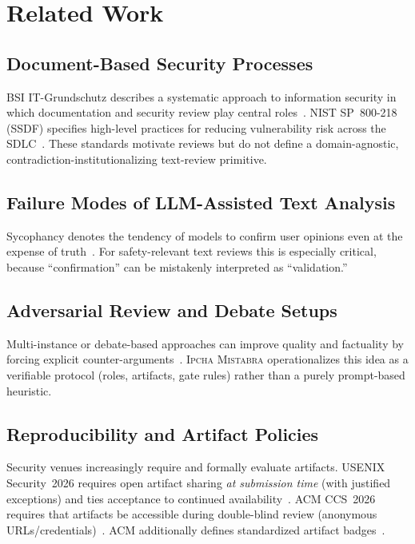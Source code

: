 \documentclass[11pt,a4paper]{article}
\newcommand{\methodname}{\textsc{Ipcha Mistabra}}
\begin{document}
\section{Related Work}

\subsection{Document-Based Security Processes}
BSI IT-Grundschutz describes a systematic approach to information security in which documentation and security review play central roles~\cite{bsi_standard_100_2}.
NIST SP~800-218 (SSDF) specifies high-level practices for reducing vulnerability risk across the SDLC~\cite{nist_sp800_218}.
These standards motivate reviews but do not define a domain-agnostic, contradiction-institutionalizing text-review primitive.

\subsection{Failure Modes of LLM-Assisted Text Analysis}
Sycophancy denotes the tendency of models to confirm user opinions even at the expense of truth~\cite{sharma_sycophancy}.
For safety-relevant text reviews this is especially critical, because ``confirmation'' can be mistakenly interpreted as ``validation.''

\subsection{Adversarial Review and Debate Setups}
Multi-instance or debate-based approaches can improve quality and factuality by forcing explicit counter-arguments~\cite{du_multiagent_debate}.
\methodname{} operationalizes this idea as a verifiable protocol (roles, artifacts, gate rules) rather than a purely prompt-based heuristic.

\subsection{Reproducibility and Artifact Policies}
Security venues increasingly require and formally evaluate artifacts.
USENIX Security~2026 requires open artifact sharing \emph{at submission time} (with justified exceptions) and ties acceptance to continued availability~\cite{usenix_sec26_artifacts,usenix_sec26_cfp}.
ACM CCS~2026 requires that artifacts be accessible during double-blind review (anonymous URLs/credentials)~\cite{ccs_2026_cfp}.
ACM additionally defines standardized artifact badges~\cite{acm_artifact_badging}.
\end{document}
